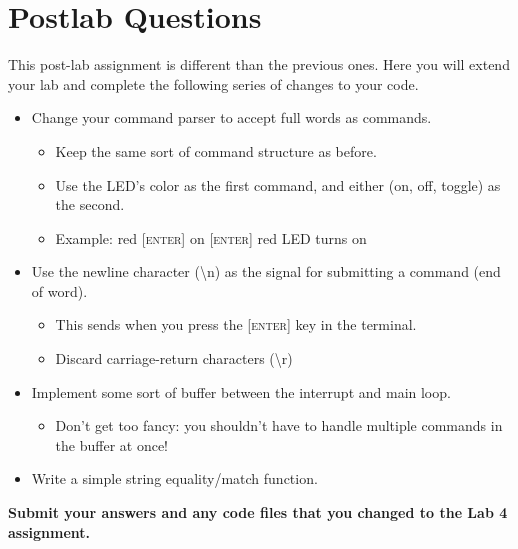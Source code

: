 \documentclass[openany,11pt,fleqn]{book} %
\begin{document}
\section{\color{blue}Postlab Questions}
\begin{question}[Postlab 4]
	This post-lab assignment is different than the previous ones. Here you will extend your lab and complete the following series of changes to your code.
	\begin{itemize}
		\item Change your command parser to accept full words as commands.
		\begin{itemize}
			\item Keep the same sort of command structure as before.
			\item Use the LED's color as the first command, and either (on, off, toggle) as the second.
			\item Example: red \textsc{[enter]} on \textsc{[enter]} \textrightarrow{} red LED turns on
		\end{itemize}
		\item Use the newline character (\textbackslash n) as the signal for submitting a command (end of word).
		\begin{itemize}
			\item This sends when you press the \textsc{[enter]} key in the terminal.
			\item Discard carriage-return characters (\textbackslash r)
		\end{itemize}
		\item Implement some sort of buffer between the interrupt and main loop.
		\begin{itemize}
			\item Don't get too fancy: you shouldn't have to handle multiple commands in the buffer at once!
		\end{itemize}
		\item Write a simple string equality/match function. 
	\end{itemize}
	\textbf{Submit your answers and any code files that you changed to the Lab 4 assignment.}
\end{question}
\end{document}
